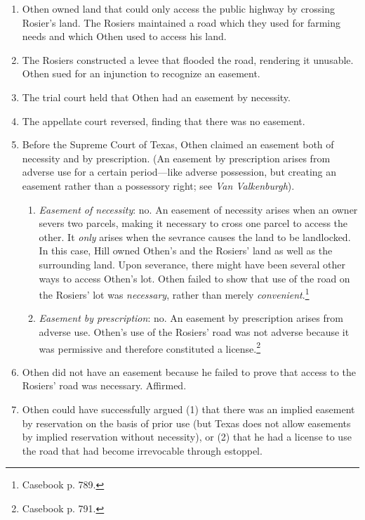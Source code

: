 \begin{enumerate}
    \item Othen owned land that could only access the public highway by 
    crossing Rosier's land. The Rosiers maintained a road which they used for 
    farming needs and which Othen used to access his land.
    \item The Rosiers constructed a levee that flooded the road, rendering it 
    unusable. Othen sued for an injunction to recognize an easement.
    \item The trial court held that Othen had an easement by necessity.
    \item The appellate court reversed, finding that there was no easement.
    \item Before the Supreme Court of Texas, Othen claimed an easement both of 
    necessity and by prescription. (An easement by prescription arises from 
    adverse use for a certain period---like adverse possession, but creating 
    an easement rather than a possessory right; see \emph{Van Valkenburgh}).
    \begin{enumerate}
        \item \emph{Easement of necessity}: no. An easement of necessity 
        arises when an owner severs two parcels, making it necessary to cross 
        one parcel to access the other. It \emph{only} arises when the 
        sevrance causes the land to be landlocked. In this case, Hill owned 
        Othen's and the Rosiers' land as well as the surrounding land. Upon 
        severance, there might have been several other ways to access Othen's 
        lot. Othen failed to show that use of the road on the Rosiers' lot was 
        \emph{necessary}, rather than merely 
        \emph{convenient}.\footnote{Casebook p. 789.}
        \item \emph{Easement by prescription}: no. An easement by prescription 
        arises from adverse use. Othen's use of the Rosiers' road was not 
        adverse because it was permissive and therefore constituted a 
        license.\footnote{Casebook p. 791.}
    \end{enumerate}
    \item Othen did not have an easement because he failed to prove that 
    access to the Rosiers' road was necessary. Affirmed.
    \item Othen could have successfully argued (1) that there was an implied 
    easement by reservation on the basis of prior use (but Texas does not 
    allow easements by implied reservation without necessity), or (2) that he 
    had a license to use the road that had become irrevocable through 
    estoppel.
\end{enumerate}


